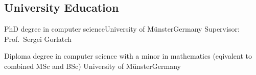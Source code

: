 \subsection{University Education}
\vspace{-1.75em}
        {PhD degree in computer science}{University of Münster}{Germany}{}
        {Supervisor: Prof.\ Sergei Gorlatch}

        {Diploma degree in computer science with a minor in mathematics}
        {\newline(eqivalent to combined MSc and BSc) University of Münster}{Germany}{}{}